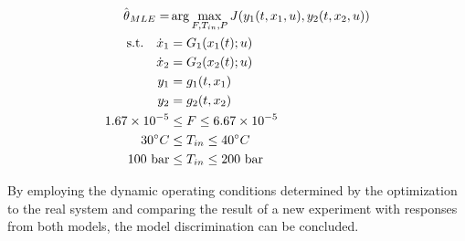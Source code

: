 \documentclass[]{scrartcl}
\begin{document}
\begin{equation}
	\begin{aligned} \label{EQ: Optimization_formulation_MLE}
		\hat{{\color{black} \theta}}_{MLE} = &\arg \max_{F, T_{in}, P} J(y_1(t,x_1,u), y_2(t,x_2,u)) \\
		 \textrm{s.t.} \quad \dot{x}_1 &= {\color{black}G_1}(x_1(t);u) \\
		 \dot{x}_2 &= {\color{black}G_2}(x_2(t);u) \\
		 y_1 &= g_1(t,x_1) \\
		 y_2 &= g_2(t,x_2) \\
		 1.67 \times 10^{-5} &\leq F \leq 6.67 \times 10^{-5}  \\
		 30^\circ C &\leq T_{in} \leq 40^\circ C \\
		 100~\text{bar} &\leq T_{in} \leq 200~\text{bar}
	\end{aligned}
\end{equation}

By employing the dynamic operating conditions determined by the optimization to the real system and comparing the result of a new experiment with responses from both models, the model discrimination can be concluded.
\end{document}
